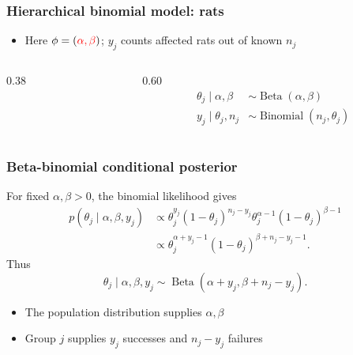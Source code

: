 \documentclass[10pt]{beamer}
\begin{document}
\begin{frame}[fragile]

\frametitle{Hierarchical binomial model: rats}

  \begin{itemize}
  \item Here $\phi=({\color{red}\alpha,\beta})$;
    $y_j$ counts affected rats out of known $n_j$
  \end{itemize}
  \begin{columns}[c,onlytextwidth]
    \begin{column}{0.38\textwidth}
      \centering
      \begin{xy}
      \end{xy}
    \end{column}
    \begin{column}{0.60\textwidth}
      \begin{align*}
        \theta_j\mid\alpha,\beta&\sim\operatorname{Beta}(\alpha,\beta)\\
        y_j\mid\theta_j,n_j&\sim\operatorname{Binomial}(n_j,\theta_j)
      \end{align*}
    \end{column}
  \end{columns}
\end{frame}

\begin{frame}
\frametitle{Beta-binomial conditional posterior}

  For fixed $\alpha,\beta>0$, the binomial likelihood gives
  \begin{align*}
    p(\theta_j\mid\alpha,\beta,y_j)
      &\propto \theta_j^{y_j}(1-\theta_j)^{n_j-y_j}
        \theta_j^{\alpha-1}(1-\theta_j)^{\beta-1}\\
      &\propto \theta_j^{\alpha+y_j-1}
        (1-\theta_j)^{\beta+n_j-y_j-1}.
  \end{align*}
  Thus
  \[
    \theta_j\mid\alpha,\beta,y_j
      \sim\operatorname{Beta}(\alpha+y_j,\beta+n_j-y_j).
  \]
  \begin{itemize}
  \item The population distribution supplies $\alpha,\beta$
  \item Group $j$ supplies $y_j$ successes and $n_j-y_j$ failures
  \end{itemize}
\end{frame}
\end{document}
